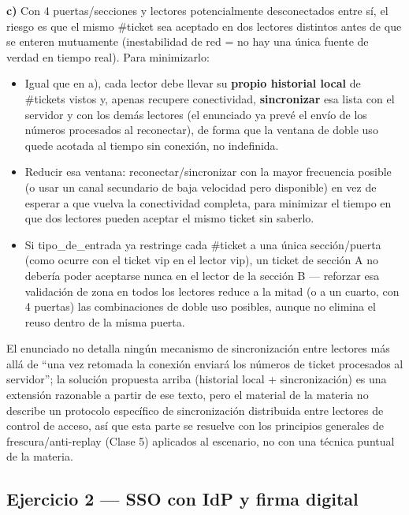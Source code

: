 \textbf{c)} Con 4 puertas/secciones y lectores potencialmente desconectados entre sí, el
riesgo es que el mismo \#ticket sea aceptado en dos lectores distintos antes de que se
enteren mutuamente (inestabilidad de red = no hay una única fuente de verdad en tiempo
real). Para minimizarlo:
\begin{itemize}
  \item Igual que en a), cada lector debe llevar su \textbf{propio historial local} de
  \#tickets vistos y, apenas recupere conectividad, \textbf{sincronizar} esa lista con el
  servidor y con los demás lectores (el enunciado ya prevé el envío de los números
  procesados al reconectar), de forma que la ventana de doble uso quede acotada al tiempo
  sin conexión, no indefinida.
  \item Reducir esa ventana: reconectar/sincronizar con la mayor frecuencia posible (o usar
  un canal secundario de baja velocidad pero disponible) en vez de esperar a que vuelva la
  conectividad completa, para minimizar el tiempo en que dos lectores pueden aceptar el mismo
  ticket sin saberlo.
  \item Si tipo\_de\_entrada ya restringe cada \#ticket a una única sección/puerta (como
  ocurre con el ticket vip en el lector vip), un ticket de sección A no debería poder
  aceptarse nunca en el lector de la sección B --- reforzar esa validación de zona en todos
  los lectores reduce a la mitad (o a un cuarto, con 4 puertas) las combinaciones de doble
  uso posibles, aunque no elimina el reuso dentro de la misma puerta.
\end{itemize}
\begin{ojo}
El enunciado no detalla ningún mecanismo de sincronización entre lectores más allá de ``una
vez retomada la conexión enviará los números de ticket procesados al servidor''; la solución
propuesta arriba (historial local + sincronización) es una extensión razonable a partir de
ese texto, pero el material de la materia no describe un protocolo específico de
sincronización distribuida entre lectores de control de acceso, así que esta parte se
resuelve con los principios generales de frescura/anti-replay (Clase 5) aplicados al
escenario, no con una técnica puntual de la materia.
\end{ojo}

\subsection{Ejercicio 2 --- SSO con IdP y firma digital}

